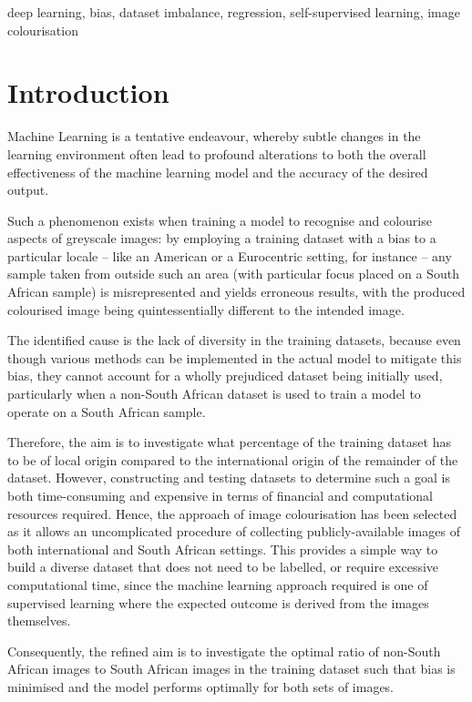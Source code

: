 \documentclass[conference]{IEEEtran}
\begin{document}
\begin{IEEEkeywords}
deep learning, bias, dataset imbalance, regression, self-supervised learning, image colourisation
\end{IEEEkeywords}

\section{Introduction}

Machine Learning is a tentative endeavour, whereby subtle changes in the learning environment often lead to profound alterations to both the overall effectiveness of the machine learning model and the accuracy of the desired output. 

Such a phenomenon exists when training a model to recognise and colourise aspects of greyscale images: by employing a training dataset with a bias to a particular locale – like an American or a Eurocentric setting, for instance – any sample taken from outside such an area (with particular focus placed on a South African sample) is misrepresented and yields erroneous results, with the produced colourised image being quintessentially different to the intended image.

The identified cause is the lack of diversity in the training datasets, because even though various methods can be implemented in the actual model to mitigate this bias, they cannot account for a wholly prejudiced dataset being initially used, particularly when a non-South African dataset is used to train a model to operate on a South African sample. 

Therefore, the aim is to investigate what percentage of the training dataset has to be of local origin compared to the international origin of the remainder of the dataset. However, constructing and testing datasets to determine such a goal is both time-consuming and expensive in terms of financial and computational resources required. Hence, the approach of image colourisation has been selected as it allows an uncomplicated procedure of collecting publicly-available images of both international and South African settings. This provides a simple way to build a diverse dataset that does not need to be labelled, or require excessive computational time, since the machine learning approach required is one of supervised learning where the expected outcome is derived from the images themselves.

Consequently, the refined aim is to investigate the optimal ratio of non-South African images to South African images in the training dataset such that bias is minimised and the model performs optimally for both sets of images.
\end{document}
